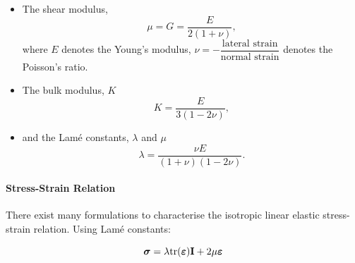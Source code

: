 \documentclass[12pt, a4paper]{article}
\numberwithin{equation}{section}
\begin{document}
\begin{itemize}
    \item The shear modulus, 
    \begin{equation}
        \mu = G = \frac{E}{2(1+\nu)},
    \end{equation}
    where $E$ denotes the Young's modulus, $\nu = -\dfrac{\text{lateral strain}}{\text{normal strain}}$ denotes the Poisson's ratio.

    \item The bulk modulus, $K$
    \begin{equation}
        K = \frac{E}{3(1-2\nu)},
    \end{equation}
    
    \item and the Lam\'e constants, $\lambda$ and $\mu$
    \begin{equation}
        \lambda = \frac{\nu E}{(1+\nu)(1-2\nu)}.
    \end{equation}
\end{itemize}
 
\paragraph{Stress-Strain Relation} There exist many formulations to characterise the isotropic linear elastic stress-strain relation. Using Lam\'e constants:

\begin{equation}
    \boldsymbol{\sigma} = \lambda \mathrm{tr} (\boldsymbol{\varepsilon}) \mathbf{I} + 2 \mu \boldsymbol{\varepsilon}
\end{equation}
\end{document}
